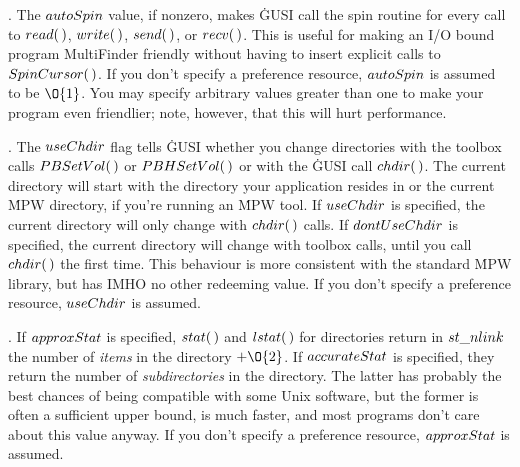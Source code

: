 . The \CD{}$\\{autoSpin}$\DC{} value, if nonzero, makes \.{GUSI} call the
spin routine for every
call to \CD{}$\\{read}(\,)$\DC{}, \CD{}$\\{write}(\,)$\DC{}, \CD{}$\\{send}(%
\,)$\DC{}, or \CD{}$\\{recv}(\,)$\DC{}. This is useful for making
an I/O bound program MultiFinder friendly without having to insert explicit
calls
to \CD{}$\\{SpinCursor}(\,)$\DC{}. If you don't specify a preference resource, %
\CD{}$\\{autoSpin}$\DC{} is assumed
to be \CD{}$\O{1}$\DC{}. You may specify arbitrary values greater than one to
make your program
even friendlier; note, however, that this will hurt performance.

\fi

. The \CD{}$\\{useChdir}$\DC{} flag tells \.{GUSI} whether you change
directories with the
toolbox calls \CD{}$\\{PBSetVol}(\,)$\DC{} or \CD{}$\\{PBHSetVol}(\,)$\DC{} or
with the \.{GUSI} call \CD{}$\\{chdir}(\,)$\DC{}.
The current directory will start with the directory your application resides in
or the current \.{MPW} directory, if you're running an \.{MPW} tool.
If \CD{}$\\{useChdir}$\DC{} is specified, the current directory will only
change with \CD{}$\\{chdir}(\,)$\DC{}
calls. If \CD{}$\\{dontUseChdir}$\DC{} is specified, the current directory will
change with
toolbox calls, until you call \CD{}$\\{chdir}(\,)$\DC{} the first time. This
behaviour is more
consistent with the standard \.{MPW} library, but has IMHO no other redeeming
value. If you don't specify a preference resource, \CD{}$\\{useChdir}$\DC{} is
assumed.

\fi

. If \CD{}$\\{approxStat}$\DC{} is specified, \CD{}$\\{stat}(\,)$\DC{} and
\CD{}$\\{lstat}(\,)$\DC{} for directories return in
\CD{}$\\{st\_nlink}$\DC{} the number of {\it items} in the directory \CD{}${+}%
\O{2}$\DC{}. If \CD{}$\\{accurateStat}$\DC{} is
specified, they return the number of {\it subdirectories} in the directory. The
latter has probably the best chances of being compatible with some Unix
software,
but the former is often a sufficient upper bound, is much faster, and most
programs
don't care about this value anyway. If you don't specify a preference resource,
\CD{}$\\{approxStat}$\DC{} is assumed.

